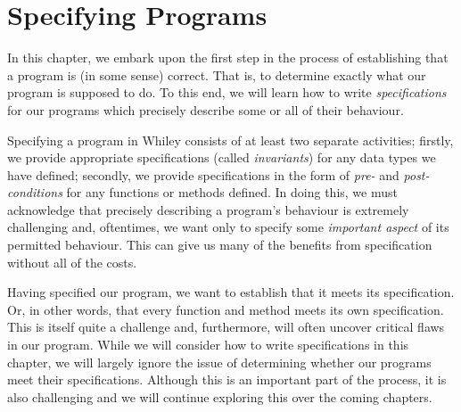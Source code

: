 \chapter{Specifying Programs}
In this chapter, we embark upon the first step in the process of establishing that a program is (in some sense) correct.  That is, to determine exactly what our program is supposed to do.  To this end, we will learn how to write {\em specifications} for our programs which precisely describe some or all of their behaviour.  

Specifying a program in Whiley consists of at least two separate activities;  firstly, we provide appropriate specifications (called
{\em invariants}) for any data types we have defined;  secondly, we provide specifications in the form of {\em pre-} and {\em post-conditions} for any functions or methods defined.  In doing this, we must acknowledge that precisely describing a program's behaviour is extremely challenging and, oftentimes, we want only to specify some {\em important aspect} of its permitted behaviour.  This can give us many of the benefits from specification without all of the costs.  

Having specified our program, we want to establish that it meets its specification.  Or, in other words, that every function and method meets its own specification.  This is itself quite a challenge and, furthermore, will often uncover critical flaws in our program.  While we will consider how to write specifications in this chapter, we will largely ignore the issue of determining whether our programs meet their specifications.  Although this is an important part of the process, it is also challenging and we will continue exploring this over the coming chapters.

